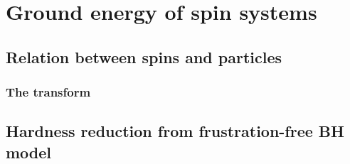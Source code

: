 % 

\chapter{Ground energy of spin systems}

\section{Relation between spins and particles}

\subsection{The transform}

\section{Hardness reduction from frustration-free BH model}
